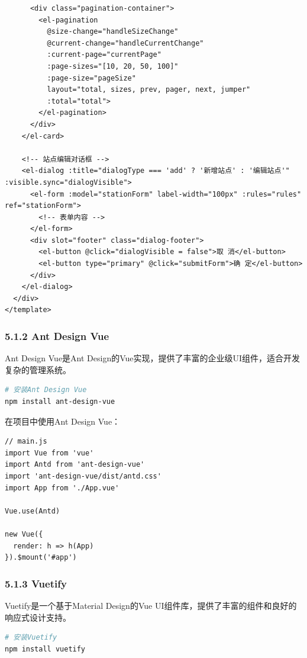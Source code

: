\begin{lstlisting}
      <div class="pagination-container">
        <el-pagination
          @size-change="handleSizeChange"
          @current-change="handleCurrentChange"
          :current-page="currentPage"
          :page-sizes="[10, 20, 50, 100]"
          :page-size="pageSize"
          layout="total, sizes, prev, pager, next, jumper"
          :total="total">
        </el-pagination>
      </div>
    </el-card>
    
    <!-- 站点编辑对话框 -->
    <el-dialog :title="dialogType === 'add' ? '新增站点' : '编辑站点'" :visible.sync="dialogVisible">
      <el-form :model="stationForm" label-width="100px" :rules="rules" ref="stationForm">
        <!-- 表单内容 -->
      </el-form>
      <div slot="footer" class="dialog-footer">
        <el-button @click="dialogVisible = false">取 消</el-button>
        <el-button type="primary" @click="submitForm">确 定</el-button>
      </div>
    </el-dialog>
  </div>
</template>
\end{lstlisting}

\subsubsection{5.1.2 Ant Design Vue}\label{ant-design-vue}

Ant Design Vue是Ant
Design的Vue实现，提供了丰富的企业级UI组件，适合开发复杂的管理系统。

\begin{lstlisting}[language=bash]
# 安装Ant Design Vue
npm install ant-design-vue
\end{lstlisting}

在项目中使用Ant Design Vue：

\begin{lstlisting}
// main.js
import Vue from 'vue'
import Antd from 'ant-design-vue'
import 'ant-design-vue/dist/antd.css'
import App from './App.vue'

Vue.use(Antd)

new Vue({
  render: h => h(App)
}).$mount('#app')
\end{lstlisting}

\subsubsection{5.1.3 Vuetify}\label{vuetify}

Vuetify是一个基于Material Design的Vue
UI组件库，提供了丰富的组件和良好的响应式设计支持。

\begin{lstlisting}[language=bash]
# 安装Vuetify
npm install vuetify
\end{lstlisting}

